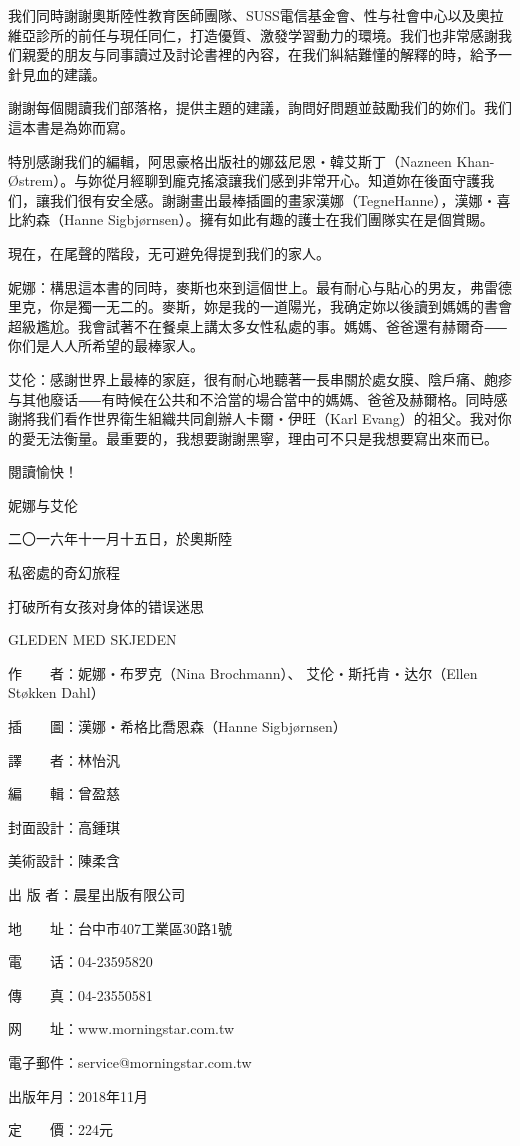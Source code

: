 \documentclass[12pt,UTF8]{ctexbook}
\begin{document}
我们同時謝謝奧斯陸性教育医師團隊、SUSS電信基金會、性与社會中心以及奧拉維亞診所的前任与現任同仁，打造優質、激發学習動力的環境。我们也非常感謝我们親愛的朋友与同事讀过及討论書裡的內容，在我们糾結難懂的解釋的時，給予一針見血的建議。

謝謝每個閱讀我们部落格，提供主題的建議，詢問好問題並鼓勵我们的妳们。我们這本書是為妳而寫。

特別感謝我们的編輯，阿思豪格出版社的娜茲尼恩‧韓艾斯丁（Nazneen Khan-Østrem）。与妳從月經聊到龐克搖滾讓我们感到非常开心。知道妳在後面守護我们，讓我们很有安全感。謝謝畫出最棒插圖的畫家漢娜（TegneHanne），漢娜‧喜比約森（Hanne Sigbjørnsen）。擁有如此有趣的護士在我们團隊实在是個賞賜。

現在，在尾聲的階段，无可避免得提到我们的家人。

妮娜：構思這本書的同時，麥斯也來到這個世上。最有耐心与貼心的男友，弗雷德里克，你是獨一无二的。麥斯，妳是我的一道陽光，我确定妳以後讀到媽媽的書會超級尷尬。我會試著不在餐桌上講太多女性私處的事。媽媽、爸爸還有赫爾奇⸺你们是人人所希望的最棒家人。

艾伦：感謝世界上最棒的家庭，很有耐心地聽著一長串關於處女膜、陰戶痛、皰疹与其他廢话⸺有時候在公共和不洽當的場合當中的媽媽、爸爸及赫爾格。同時感謝將我们看作世界衛生組織共同創辦人卡爾‧伊旺（Karl Evang）的祖父。我对你的愛无法衡量。最重要的，我想要謝謝黑寧，理由可不只是我想要寫出來而已。



閱讀愉快！

妮娜与艾伦

二〇一六年十一月十五日，於奧斯陸





私密處的奇幻旅程


打破所有女孩对身体的错误迷思


GLEDEN MED SKJEDEN




作　　者：妮娜‧布罗克（Nina Brochmann）、 艾伦‧斯托肯‧达尔（Ellen Støkken Dahl）

插　　圖：漢娜‧希格比喬恩森（Hanne Sigbjørnsen）

譯　　者：林怡汎

編　　輯：曾盈慈

封面設計：高鍾琪

美術設計：陳柔含

出 版 者：晨星出版有限公司

地　　址：台中市407工業區30路1號

電　　话：04-23595820

傳　　真：04-23550581

网　　址：www.morningstar.com.tw

電子郵件：service@morningstar.com.tw

出版年月：2018年11月

定　　價：224元
\end{document}
